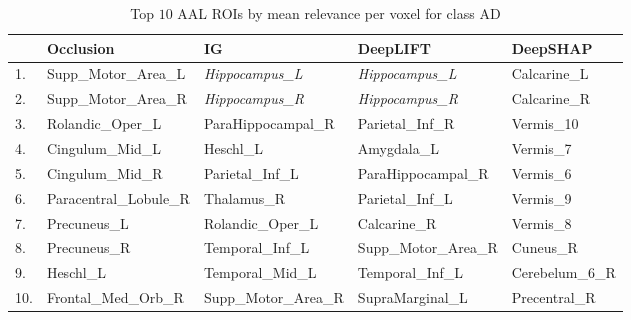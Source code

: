\begin{table}
	\centering
	\footnotesize
	\begin{tabularx}{\textwidth}{lXXXX}
		\toprule
		    & Occlusion              & IG                    & DeepLIFT              & DeepSHAP        \\
		\midrule
		1.  & Supp\_Motor\_Area\_L   & \emph{Hippocampus\_L} & \emph{Hippocampus\_L} & Calcarine\_L    \\
		2.  & Supp\_Motor\_Area\_R   & \emph{Hippocampus\_R} & \emph{Hippocampus\_R} & Calcarine\_R    \\
		3.  & Rolandic\_Oper\_L      & ParaHippocampal\_R    & Parietal\_Inf\_R      & Vermis\_10      \\
		4.  & Cingulum\_Mid\_L       & Heschl\_L             & Amygdala\_L           & Vermis\_7       \\
		5.  & Cingulum\_Mid\_R       & Parietal\_Inf\_L      & ParaHippocampal\_R    & Vermis\_6       \\
		6.  & Paracentral\_Lobule\_R & Thalamus\_R           & Parietal\_Inf\_L      & Vermis\_9       \\
		7.  & Precuneus\_L           & Rolandic\_Oper\_L     & Calcarine\_R          & Vermis\_8       \\
		8.  & Precuneus\_R           & Temporal\_Inf\_L      & Supp\_Motor\_Area\_R  & Cuneus\_R       \\
		9.  & Heschl\_L              & Temporal\_Mid\_L      & Temporal\_Inf\_L      & Cerebelum\_6\_R \\
		10. & Frontal\_Med\_Orb\_R   & Supp\_Motor\_Area\_R  & SupraMarginal\_L      & Precentral\_R   \\
	\end{tabularx}
	\caption*{Top $10$ AAL ROIs by mean relevance per voxel for class AD}\label{tab:top10-mean}
\end{table}
